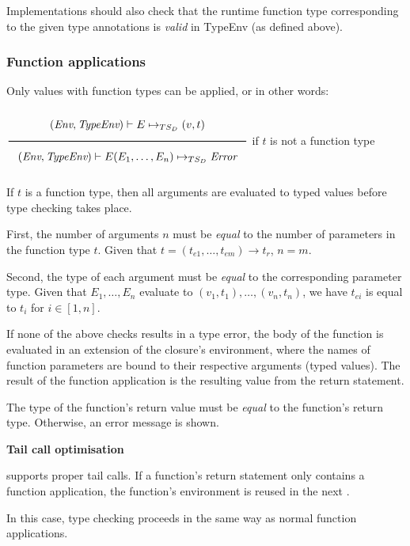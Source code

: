 Implementations should also check that the runtime function type corresponding to the given type annotations is \textit{valid} in TypeEnv (as defined above).



\subsubsection*{Function applications}

Only values with function types can be applied, or in other words:

\begin{center}
    $\Rule{ (\textit{Env}, \textit{TypeEnv}) \vdash E \Eval (v, t)}{ (\textit{Env}, \textit{TypeEnv}) \vdash E(E_1, \dots, E_n) \Eval \textit{Error} }$ 
    if $t$ is not a function type
\end{center}

If $t$ is a function type, then all arguments are evaluated to typed values before type checking takes place.

First, the number of arguments $n$ must be \textit{equal} to the number of parameters in the function type $t$.
Given that $t = (t_{e1}, \dots, t_{em}) \rightarrow t_r$, $n = m$.

Second, the type of each argument must be \textit{equal} to the corresponding parameter type.
Given that $E_1, \dots, E_n$ evaluate to $(v_1, t_1), \dots, (v_n, t_n)$, we have $t_{ei}$ is equal to $t_i$ for $i \in [1, n]$.

If none of the above checks results in a type error, the body of the function is evaluated in an extension of the closure's environment, where the names of function parameters are bound to their respective arguments (typed values).
The result of the function application is the resulting value from the return statement.

The type of the function's return value must be \textit{equal} to the function's return type. 
Otherwise, an error message is shown.

\vspace{1em}
\textbf{Tail call optimisation}

\DynamicTS{} supports proper tail calls. 
If a function's return statement only contains a function application, the function's environment is reused in the next .

In this case, type checking proceeds in the same way as normal function applications.

